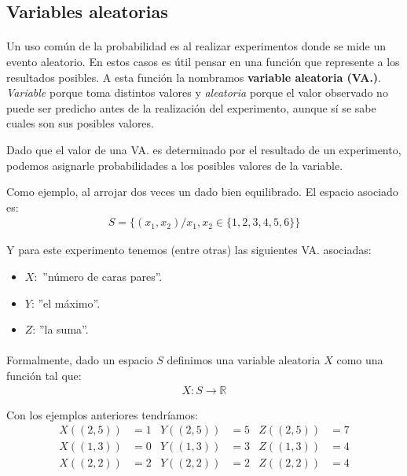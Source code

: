 \documentclass[../main.tex]{subfiles}
\begin{document}
\subsection{Variables aleatorias}

\paragraph{} Un uso común de la probabilidad es al realizar experimentos donde se mide un evento aleatorio. En estos casos es útil pensar en una función que represente a los resultados posibles. A esta función la nombramos \textbf{variable aleatoria (VA.)}. \textit{Variable} porque toma distintos valores y \textit{aleatoria} porque el valor observado no puede ser predicho antes de la realización del experimento, aunque sí se sabe cuales son sus posibles valores.

Dado que el valor de una VA. es determinado por el resultado de un experimento, podemos asignarle probabilidades a los posibles valores de la variable.

Como ejemplo, al arrojar dos veces un dado bien equilibrado. El espacio asociado es:
\begin{gather*}
  S = \{(x_{1}, x_{2}) / x_{1}, x_{2} \in \{1, 2, 3, 4, 5, 6\}\}
\end{gather*}

Y para este experimento tenemos (entre otras) las siguientes VA. asociadas:
\begin{itemize}
  \item \(X:\) ''número de caras pares''.
  \item \(Y\): ''el máximo''.
  \item \(Z\): ''la suma''.
\end{itemize}

\paragraph{} Formalmente, dado un espacio \(S\) definimos una variable aleatoria \(X\) como una función tal que:
\begin{gather*}
  X : S \rightarrow \mathbb{R}
\end{gather*}

Con los ejemplos anteriores tendríamos:
\begin{align*}
  X((2, 5)) &= 1 & Y((2, 5)) &= 5 & Z((2, 5)) &= 7 \\
  X((1, 3)) &= 0 & Y((1, 3)) &= 3 & Z((1, 3)) &= 4 \\
  X((2, 2)) &= 2 & Y((2, 2)) &= 2 & Z((2, 2)) &= 4 \\
\end{align*}
\end{document}

